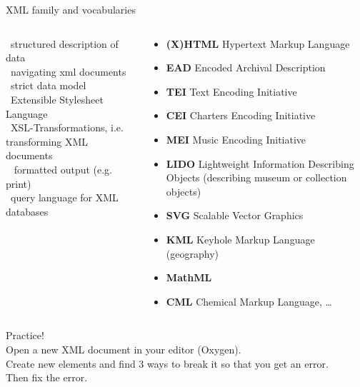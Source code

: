 \begin{frame}{XML family and vocabularies}
\begin{columns}
\footnotesize
{}~structured description of data \\
~navigating xml documents \\
~strict data model \\
~Extensible Stylesheet Language  \\
~XSL-Transformations, i.e. transforming XML documents  \\
~ formatted output (e.g. print) \\
~query language for XML databases \\
~
\begin{block}{}
\footnotesize
\begin{itemize}
    \item \textbf{(X)HTML} Hypertext Markup Language 
    \item \textbf{EAD} Encoded Archival Description 
    \item \textbf{TEI} Text Encoding Initiative 
    \item \textbf{CEI} Charters Encoding Initiative 
    \item \textbf{MEI} Music Encoding Initiative 
    \item \textbf{LIDO} Lightweight Information Describing Objects (describing museum or collection objects)
    \item \textbf{SVG} Scalable Vector Graphics 
    \item \textbf{KML} Keyhole Markup Language (geography)
    \item \textbf{MathML} 
    \item \textbf{CML} Chemical Markup Language, \dots
\end{itemize}
\end{block}
\end{columns}


\end{frame}



\begin{frame}[standout]
  \alert{Practice!} \\
  \normalsize
  Open a new XML document in your editor (Oxygen). \\
  Create new elements and find 3 ways to break it so that you get an error. \\
  Then fix the error.

\end{frame}
